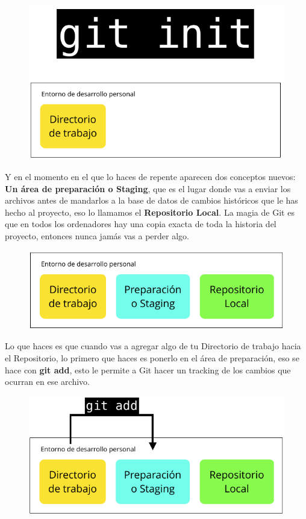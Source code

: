 \documentclass{article}
\begin{document}
\begin{figure}[h!]
  \centering
  \includegraphics[scale=0.6]{./Pictures/117_git_init.png}
\end{figure}

Y en el momento en el que lo haces de repente aparecen dos conceptos nuevos:
\textbf{Un área de preparación o Staging}, que es el lugar donde vas a enviar
los archivos antes de mandarlos a la base de datos de cambios históricos que le
has hecho al proyecto, eso lo llamamos el \textbf{Repositorio Local}. La magia
de Git es que en todos los ordenadores hay una copia exacta de toda la historia
del proyecto, entonces nunca jamás vas a perder algo.

\begin{figure}[h!]
  \centering
  \includegraphics[scale=0.6]{./Pictures/118_wd_sa_r.png}
\end{figure}

Lo que haces es que cuando vas a agregar algo de tu Directorio de trabajo hacia
el Repositorio, lo primero que haces es ponerlo en el área de preparación, eso
se hace con \textbf{git add}, esto le permite a Git hacer un tracking de los
cambios que ocurran en ese archivo.

\begin{figure}[h!]
  \centering
  \includegraphics[scale=0.6]{./Pictures/119_git_add.png}
\end{figure}
\end{document}
